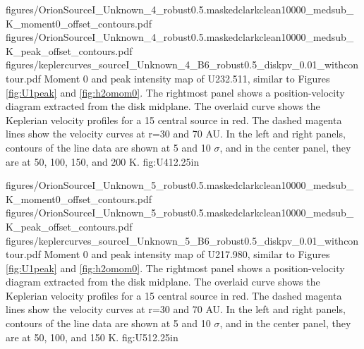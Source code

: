 \documentclass[twocolumn]{aastex62}
\begin{document}
\FigureThree
{{figures/OrionSourceI_Unknown_4_robust0.5.maskedclarkclean10000_medsub_K_moment0_offset_contours}.pdf}
{{figures/OrionSourceI_Unknown_4_robust0.5.maskedclarkclean10000_medsub_K_peak_offset_contours}.pdf}
{{figures/keplercurves_sourceI_Unknown_4_B6_robust0.5_diskpv_0.01_withcontour}.pdf}
{Moment 0 and peak intensity map of U232.511, similar to Figures \ref{fig:U1peak} and \ref{fig:h2omom0}.
The rightmost panel shows a position-velocity diagram extracted from the disk midplane.
The overlaid  curve shows the Keplerian velocity profiles for a 15 \msun central source in red.
The dashed magenta lines show the velocity curves at r=30 and 70 AU.
In the left and right panels, contours of the line data are shown at 5 and 10 $\sigma$,
and in the center panel, they are at 50, 100, 150, and 200 K.
}
{fig:U4}{1}{2.25in}

\FigureThree
{{figures/OrionSourceI_Unknown_5_robust0.5.maskedclarkclean10000_medsub_K_moment0_offset_contours}.pdf}
{{figures/OrionSourceI_Unknown_5_robust0.5.maskedclarkclean10000_medsub_K_peak_offset_contours}.pdf}
{{figures/keplercurves_sourceI_Unknown_5_B6_robust0.5_diskpv_0.01_withcontour}.pdf}
{Moment 0 and peak intensity map of U217.980, similar to Figures \ref{fig:U1peak} and \ref{fig:h2omom0}.
The rightmost panel shows a position-velocity diagram extracted from the disk midplane.
The overlaid  curve shows the Keplerian velocity profiles for a 15 \msun central source in red.
The dashed magenta lines show the velocity curves at r=30 and 70 AU.
In the left and right panels, contours of the line data are shown at 5 and 10 $\sigma$,
and in the center panel, they are at 50, 100, and 150 K.
}
{fig:U5}{1}{2.25in}
\end{document}

